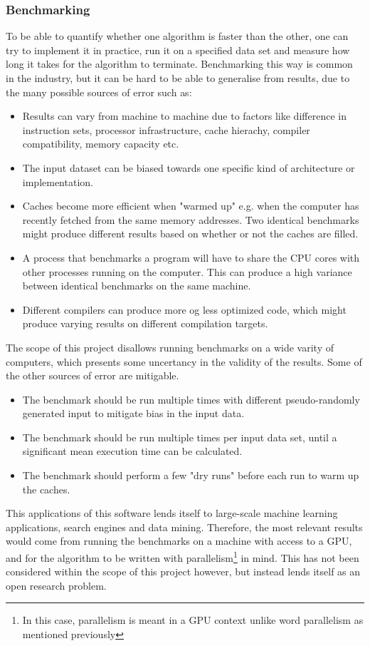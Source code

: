 \subsubsection{Benchmarking}
To be able to quantify whether one algorithm is faster than the other, one can try to implement it in practice, run it on a specified data set and measure how long it takes for the algorithm to terminate. Benchmarking this way is common in the industry, but it can be hard to be able to generalise from results, due to the many possible sources of error such as:
\begin{itemize}
    \item Results can vary from machine to machine due to factors like difference in instruction sets, processor infrastructure, cache hierachy, compiler compatibility, memory capacity etc.
    \item The input dataset can be biased towards one specific kind of architecture or implementation.
    \item Caches become more efficient when "warmed up" e.g. when the computer has recently fetched from the same memory addresses. Two identical benchmarks might produce different results based on whether or not the caches are filled.
    \item A process that benchmarks a program will have to share the CPU cores with other processes running on the computer. This can produce a high variance between identical benchmarks on the same machine.
    \item Different compilers can produce more og less optimized code, which might produce varying results on different compilation targets.
\end{itemize}
The scope of this project disallows running benchmarks on a wide varity of computers, which presents some uncertancy in the validity of the results. Some of the other sources of error are mitigable.
\begin{itemize}
    \item The benchmark should be run multiple times with different pseudo-randomly generated input to mitigate bias in the input data.
    \item The benchmark should be run multiple times per input data set, until a significant mean execution time can be calculated.
    \item The benchmark should perform a few "dry runs" before each run to warm up the caches.
\end{itemize}
This applications of this software lends itself to large-scale machine learning applications, search engines and data mining. Therefore, the most relevant results would come from running the benchmarks on a machine with access to a GPU, and for the algorithm to be written with parallelism\footnote{In this case, parallelism is meant in a GPU context unlike word parallelism as mentioned previously} in mind. This has not been considered within the scope of this project however, but instead lends itself as an open research problem.
